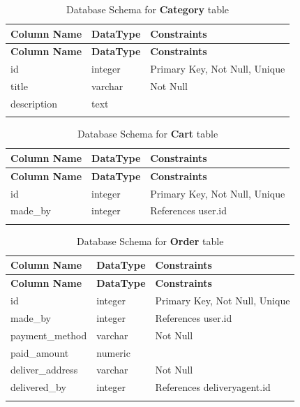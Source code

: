 \documentclass[12pt]{report}
\begin{document}
\begin{longtable}[H]{|l|l|p{6.5cm}||}
	\hline
	\textbf{Column Name} & \textbf{DataType} & \textbf{Constraints}          \\
	\hline
	\endfirsthead
	\hline
	\textbf{Column Name} & \textbf{DataType} & \textbf{Constraints}          \\
	\hline
	\endhead
	id                   & integer           & Primary Key, Not Null, Unique \\
	\hline
	title                & varchar           & Not Null                      \\
	\hline
	description          & text              &                               \\
	\hline
	\hline
	\caption{Database Schema for \textbf{Category} table}\label{tab:tableCategory}
\end{longtable}

\begin{longtable}[H]{|l|l|p{6.5cm}||}
	\hline
	\textbf{Column Name} & \textbf{DataType} & \textbf{Constraints}          \\
	\hline
	\endfirsthead
	\hline
	\textbf{Column Name} & \textbf{DataType} & \textbf{Constraints}          \\
	\hline
	\endhead
	id                   & integer           & Primary Key, Not Null, Unique \\
	\hline
	made\_by             & integer           & References user.id            \\
	\hline
	\hline
	\caption{Database Schema for \textbf{Cart} table}\label{tab:tableCart}
\end{longtable}

\begin{longtable}[H]{|l|l|p{6.5cm}||}
	\hline
	\textbf{Column Name} & \textbf{DataType} & \textbf{Constraints}          \\
	\hline
	\endfirsthead
	\hline
	\textbf{Column Name} & \textbf{DataType} & \textbf{Constraints}          \\
	\hline
	\endhead
	id                   & integer           & Primary Key, Not Null, Unique \\
	\hline
	made\_by             & integer           & References user.id            \\
	\hline
	payment\_method      & varchar           & Not Null                      \\
	\hline
	paid\_amount         & numeric           &                               \\
	\hline
	deliver\_address     & varchar           & Not Null                      \\
	\hline
	delivered\_by        & integer           & References deliveryagent.id   \\
	\hline
	\hline
	\caption{Database Schema for \textbf{Order} table}\label{tab:tableOrder}
\end{longtable}
\end{document}

